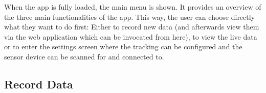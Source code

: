 \begin{minipage}{0.45\textwidth}
When the app is fully loaded, the main menu is shown. It provides an overview of the three main functionalities of the app. This way, the user can choose directly what they want to do first:
Either to record new data (and afterwards view them via the web application which can be invocated from here), to view the live data or to enter the settings screen where the tracking can be configured and the sensor device can be scanned for and connected to.
\end{minipage} \hfill
\begin{minipage}{0.5\textwidth}
\end{minipage}

\subsection{Record Data}

